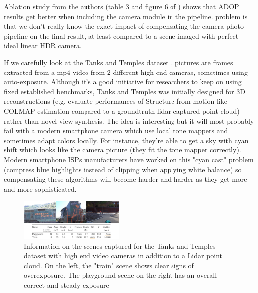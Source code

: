 Ablation study from the authors (table 3 and figure 6 of \cite{ruckert2022adop}) shows that ADOP results get better when including the camera module in the pipeline. problem is that we don't really know the exact impact of compensating the camera photo pipeline on the final result, at least compared to a scene imaged with perfect ideal linear HDR camera. 

If we carefully look at the Tanks and Temples dataset \cite{Knapitsch2017TanksAndTemples}, pictures are frames extracted from a mp4 video from 2 different high end cameras, sometimes using auto-exposure. Although it's a good initiative for researchers to keep on using fixed established benchmarks, Tanks and Temples was initially designed for 3D reconstructions (e.g. evaluate performances of Structure from motion like COLMAP estimation compared to a groundtruth lidar captured point cloud) rather than novel view synthesis. The idea is interesting but it will most probably fail with a modern smartphone camera which use local tone mappers and sometimes adapt colors locally. For instance, they're able to get a sky with cyan shift which looks like the camera picture (they fit the tone mapper correctly). Modern smartphone ISPs manufacturers have worked on this "cyan cast" problem (compress blue highlights instead of clipping when applying white balance) so compensating these algorithms will become harder and harder as they get more and more sophisticated.


\begin{figure}[H]
    \centering
    \includegraphics[width=0.45\textwidth]{figures/tanks_and_temples.png}
    \caption{Information on the scenes captured for the Tanks and Temples dataset with high end video cameras in addition to a Lidar point cloud. On the left, the "train" scene shows clear signs of overexposure. The playground scene on the right has an overall correct and steady exposure}
    \label{fig:tank_and_temples}
\end{figure}



